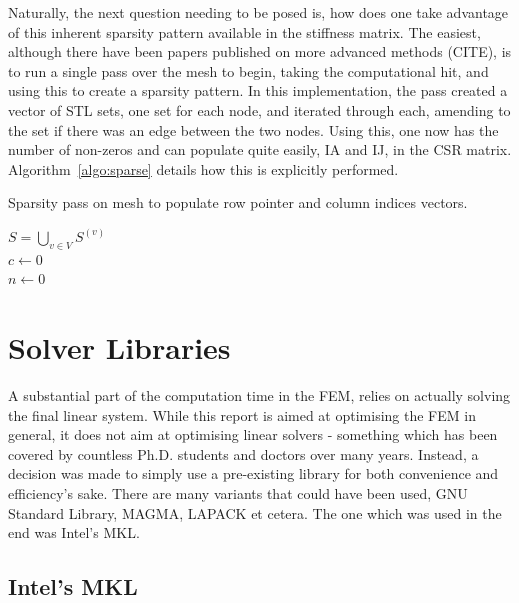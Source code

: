 Naturally, the next question needing to be posed is, how does one take advantage of this inherent sparsity pattern available in the stiffness matrix. The easiest, although there have been papers published on more advanced methods (CITE), is to run a single pass over the mesh to begin, taking the computational hit, and using this to create a sparsity pattern. In this implementation, the pass created a vector of STL sets, one set for each node, and iterated through each, amending to the set if there was an edge between the two nodes. Using this, one now has the number of non-zeros and can populate quite easily, IA and IJ, in the CSR matrix. Algorithm~\ref{algo:sparse} details how this is explicitly performed.
\begin{algorithm}
	\caption{Sparsity pass on mesh to populate row pointer and column indices vectors.}
	\label{algo:sparse}
	$S = \bigcup_{v \in V} S^{(v)}$\\
	$c \leftarrow 0$\\
	$n \leftarrow 0$\\
\end{algorithm}

\section{Solver Libraries}

A substantial part of the computation time in the FEM, relies on actually solving the final linear system. While this report is aimed at optimising the FEM in general, it does not aim at optimising linear solvers - something which has been covered by countless Ph.D. students and doctors over many years. Instead, a decision was made to simply use a pre-existing library for both convenience and efficiency's sake. There are many variants that could have been used, GNU Standard Library, MAGMA, LAPACK et cetera. The one which was used in the end was Intel's MKL.

\subsection{Intel's MKL}\label{mkl}

